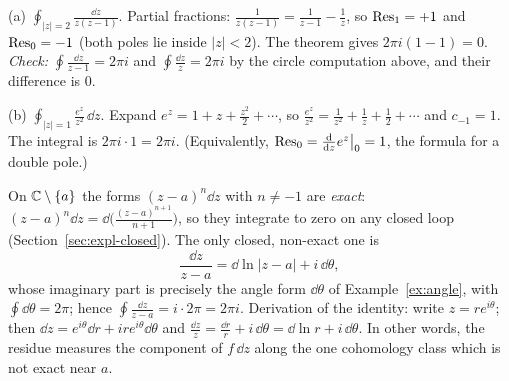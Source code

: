 \begin{example}\label{ex:residues}
(a) $\displaystyle\oint_{|z|=2}\frac{\dd z}{z(z-1)}$. Partial fractions: $\frac1{z(z-1)}=\frac1{z-1}-\frac1z$, so $\operatorname{Res}_1=+1$ and $\operatorname{Res}_0=-1$ (both poles lie inside $|z|<2$). The theorem gives $2\pi i(1-1)=0$.
\emph{Check:} $\oint\frac{\dd z}{z-1}=2\pi i$ and $\oint\frac{\dd z}z=2\pi i$ by the circle computation above, and their difference is $0$.

(b) $\displaystyle\oint_{|z|=1}\frac{e^z}{z^2}\,\dd z$. Expand $e^z=1+z+\frac{z^2}2+\cdots$, so $\frac{e^z}{z^2}=\frac1{z^2}+\frac1z+\frac12+\cdots$ and $c_{-1}=1$. The integral is $2\pi i\cdot1=2\pi i$. (Equivalently, $\operatorname{Res}_0=\frac{\mathrm{d}}{\mathrm{d} z}e^z\big|_0=1$, the formula for a double pole.)
\end{example}

\begin{keyidea}
On $\mathbb{C}\setminus\{a\}$ the forms $(z-a)^n\dd z$ with $n\neq-1$ are \emph{exact}: $(z-a)^n\dd z=\dd\bigl(\frac{(z-a)^{n+1}}{n+1}\bigr)$, so they integrate to zero on any closed loop (Section~\ref{sec:expl-closed}). The only closed, non-exact one is
\begin{equation}\label{eq:dzoverz}
\frac{\dd z}{z-a}=\dd\ln|z-a|+i\,\dd\theta,
\end{equation}
whose imaginary part is precisely the angle form $\dd\theta$ of Example~\ref{ex:angle}, with $\oint\dd\theta=2\pi$; hence $\oint\frac{\dd z}{z-a}=i\cdot2\pi=2\pi i$. Derivation of the identity: write $z=re^{i\theta}$; then $\dd z=e^{i\theta}\dd r+ire^{i\theta}\dd\theta$ and $\frac{\dd z}z=\frac{\dd r}r+i\,\dd\theta=\dd\ln r+i\,\dd\theta$.
In other words, the residue measures the component of $f\,\dd z$ along the one cohomology class which is not exact near $a$.
\end{keyidea}
